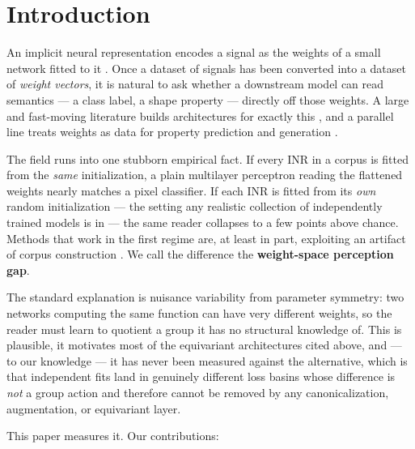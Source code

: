 \documentclass[10pt,letterpaper]{article}
\theoremstyle{definition}
\begin{document}
\section{Introduction}

An implicit neural representation encodes a signal as the weights of a small network fitted to
it \citep{sitzmann2020siren,mildenhall2020nerf,tancik2020fourier}. Once a dataset of signals has
been converted into a dataset of \emph{weight vectors}, it is natural to ask whether a downstream
model can read semantics --- a class label, a shape property --- directly off those weights. A
large and fast-moving literature builds architectures for exactly this
\citep{navon2023dws,zhou2023nfn,zhou2023nft,lim2024gmn,kofinas2024graph,tran2024monomial,%
zhou2024unf,kalogeropoulos2024scalegmn,schurholt2024sane}, and a parallel line treats weights as
data for property prediction and generation
\citep{unterthiner2020predicting,schurholt2021hyperrep,schurholt2022zoos,erkoc2023hyperdiffusion,%
peebles2022gpt}.

The field runs into one stubborn empirical fact. If every INR in a corpus is fitted from the
\emph{same} initialization, a plain multilayer perceptron reading the flattened weights nearly
matches a pixel classifier. If each INR is fitted from its \emph{own} random initialization ---
the setting any realistic collection of independently trained models is in --- the same reader
collapses to a few points above chance. Methods that work in the first regime are, at least in
part, exploiting an artifact of corpus construction
\citep{deluigi2023inr2vec,papa2024howtotrain}. We call the difference the \textbf{weight-space
perception gap}.

The standard explanation is nuisance variability from parameter symmetry: two networks computing
the same function can have very different weights, so the reader must learn to quotient a group
it has no structural knowledge of. This is plausible, it motivates most of the equivariant
architectures cited above, and --- to our knowledge --- it has never been measured against the
alternative, which is that independent fits land in genuinely different loss basins whose
difference is \emph{not} a group action and therefore cannot be removed by any canonicalization,
augmentation, or equivariant layer.

This paper measures it. Our contributions:
\end{document}
